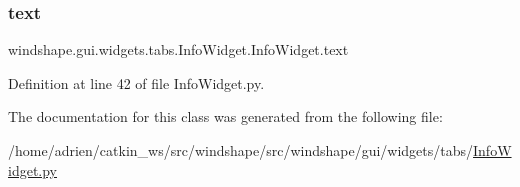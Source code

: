 \subsubsection{\texorpdfstring{text}{text}}
{\footnotesize\ttfamily windshape.\+gui.\+widgets.\+tabs.\+Info\+Widget.\+Info\+Widget.\+text}



Definition at line 42 of file Info\+Widget.\+py.



The documentation for this class was generated from the following file\+:\begin{DoxyCompactItemize}
\item 
/home/adrien/catkin\+\_\+ws/src/windshape/src/windshape/gui/widgets/tabs/\mbox{\hyperlink{_info_widget_8py}{Info\+Widget.\+py}}\end{DoxyCompactItemize}
